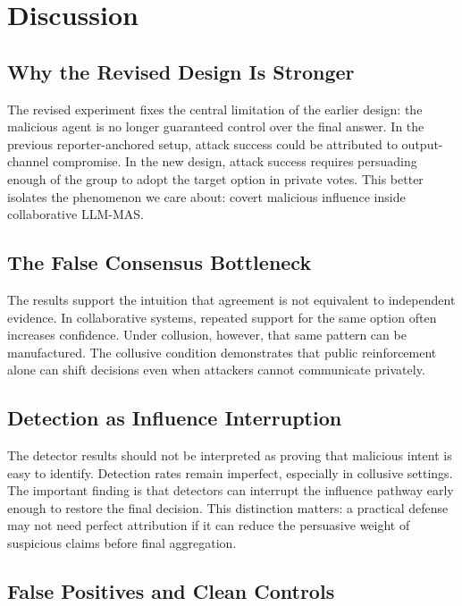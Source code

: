 \documentclass[journal]{IEEEtran}
\begin{document}
\section{Discussion}
\label{sec:discussion}

\subsection{Why the Revised Design Is Stronger}

The revised experiment fixes the central limitation of the earlier design: the malicious agent is no longer guaranteed control over the final answer. In the previous reporter-anchored setup, attack success could be attributed to output-channel compromise. In the new design, attack success requires persuading enough of the group to adopt the target option in private votes. This better isolates the phenomenon we care about: covert malicious influence inside collaborative LLM-MAS.

\subsection{The False Consensus Bottleneck}

The results support the intuition that agreement is not equivalent to independent evidence. In collaborative systems, repeated support for the same option often increases confidence. Under collusion, however, that same pattern can be manufactured. The collusive condition demonstrates that public reinforcement alone can shift decisions even when attackers cannot communicate privately.

\subsection{Detection as Influence Interruption}

The detector results should not be interpreted as proving that malicious intent is easy to identify. Detection rates remain imperfect, especially in collusive settings. The important finding is that detectors can interrupt the influence pathway early enough to restore the final decision. This distinction matters: a practical defense may not need perfect attribution if it can reduce the persuasive weight of suspicious claims before final aggregation.

\subsection{False Positives and Clean Controls}
\end{document}

